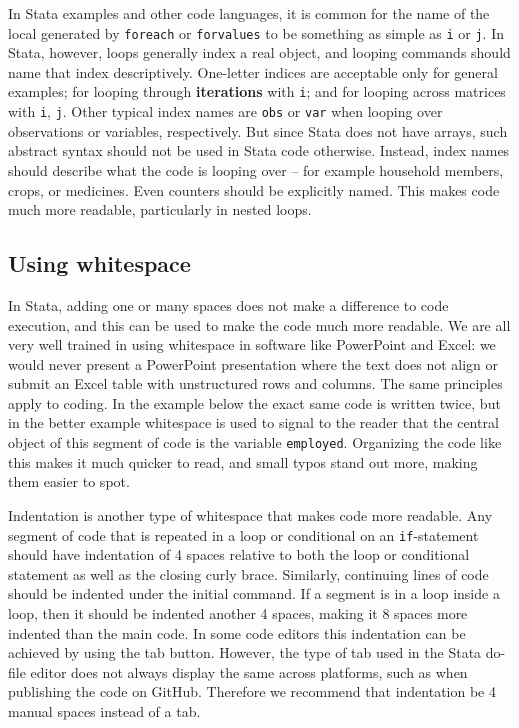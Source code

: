 In Stata examples and other code languages, it is common for the name of the local generated by \texttt{foreach} or \texttt{forvalues}
to be something as simple as \texttt{i} or \texttt{j}. In Stata, however,
loops generally index a real object, and looping commands should name that index descriptively.
One-letter indices are acceptable only for general examples;
for looping through \textbf{iterations} with \texttt{i};
and for looping across matrices with \texttt{i}, \texttt{j}.
Other typical index names are \texttt{obs} or \texttt{var} when looping over observations or variables, respectively.
But since Stata does not have arrays,
such abstract syntax should not be used in Stata code otherwise.
Instead, index names should describe what the code is looping over --
for example household members, crops, or medicines.
Even counters should be explicitly named.
This makes code much more readable, particularly in nested loops.


\subsection{Using whitespace}

In Stata, adding one or many spaces does not make a difference to code execution,
and this can be used to make the code much more readable.
We are all very well trained in using whitespace in software like PowerPoint and Excel:
we would never present a PowerPoint presentation where the text does not align
or submit an Excel table with unstructured rows and columns.
The same principles apply to coding.
In the example below the exact same code is written twice,
but in the better example whitespace is used to signal to the reader
that the central object of this segment of code is the variable \texttt{employed}.
Organizing the code like this makes it much quicker to read,
and small typos stand out more, making them easier to spot.


\noindent Indentation is another type of whitespace that makes code more readable.
Any segment of code that is repeated in a loop or conditional on an
\texttt{if}-statement should have indentation of 4 spaces relative
to both the loop or conditional statement as well as the closing curly brace.
Similarly, continuing lines of code should be indented under the initial command.
If a segment is in a loop inside a loop, then it should be indented another 4 spaces,
making it 8 spaces more indented than the main code.
In some code editors this indentation can be achieved by using the tab button.
However, the type of tab used in the Stata do-file editor does not always display the same across platforms,
such as when publishing the code on GitHub.
Therefore we recommend that indentation be 4 manual spaces instead of a tab.

